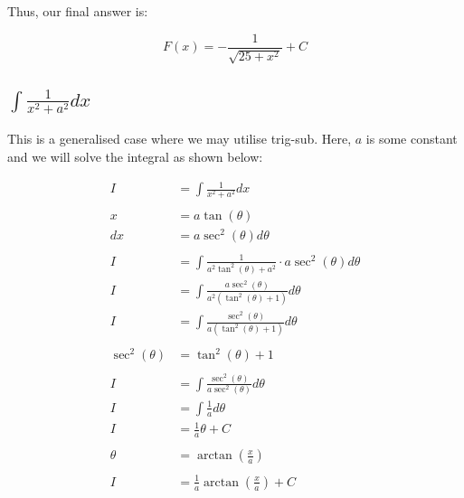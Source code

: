 \documentclass[12pt]{article}
\begin{document}
Thus, our final answer is:

$$
    F(x) = -\frac{1}{\sqrt{25+x^2}} + C
$$

\subsection{$\int \frac{1}{x^2+a^2} dx$}

This is a generalised case where we may utilise trig-sub.
Here, $a$ is some constant and we will solve the integral as shown below:


\begin{align}
    I              & = \int \frac{1}{x^2+a^2} dx                                          \\
    \nonumber                                                                             \\
    x              & = a\tan(\theta)                                                      \\
    dx             & = a\sec^2(\theta) d\theta                                            \\
    \nonumber                                                                             \\
    I              & = \int \frac{1}{a^2\tan^2(\theta)+a^2} \cdot a\sec^2(\theta) d\theta \\
    I              & = \int \frac{a\sec^2(\theta)}{a^2(\tan^2(\theta)+1)} d\theta         \\
    I              & = \int \frac{\sec^2(\theta)}{a(\tan^2(\theta)+1)} d\theta            \\
    \nonumber                                                                             \\
    \sec^2(\theta) & = \tan^2(\theta) + 1                                                 \\
    \nonumber                                                                             \\
    I              & = \int \frac{\sec^2(\theta)}{a\sec^2(\theta)} d\theta                \\
    I              & = \int \frac{1}{a} d\theta                                           \\
    I              & = \frac{1}{a}\theta + C                                              \\
    \nonumber                                                                             \\
    \theta         & = \arctan\left(\frac{x}{a}\right)                                    \\
    \nonumber                                                                             \\
    I              & = \frac{1}{a}\arctan\left(\frac{x}{a}\right) + C
\end{align}
\end{document}
